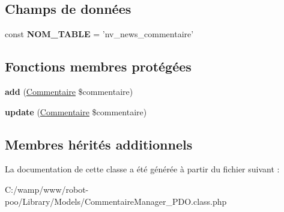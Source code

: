 \subsection*{Champs de données}
\begin{DoxyCompactItemize}
\item 
\hypertarget{class_library_1_1_models_1_1_commentaire_manager___p_d_o_a243755033f10b0817aa9d990cc252817}{const {\bfseries N\+O\+M\+\_\+\+T\+A\+B\+L\+E} = 'nv\+\_\+news\+\_\+commentaire'}\label{class_library_1_1_models_1_1_commentaire_manager___p_d_o_a243755033f10b0817aa9d990cc252817}

\end{DoxyCompactItemize}
\subsection*{Fonctions membres protégées}
\begin{DoxyCompactItemize}
\item 
\hypertarget{class_library_1_1_models_1_1_commentaire_manager___p_d_o_a061ee602fea7e6e7901bced121a867e1}{{\bfseries add} (\hyperlink{class_library_1_1_entities_1_1_commentaire}{Commentaire} \$commentaire)}\label{class_library_1_1_models_1_1_commentaire_manager___p_d_o_a061ee602fea7e6e7901bced121a867e1}

\item 
\hypertarget{class_library_1_1_models_1_1_commentaire_manager___p_d_o_ad360efa5cec15a5eea694752003ab09b}{{\bfseries update} (\hyperlink{class_library_1_1_entities_1_1_commentaire}{Commentaire} \$commentaire)}\label{class_library_1_1_models_1_1_commentaire_manager___p_d_o_ad360efa5cec15a5eea694752003ab09b}

\end{DoxyCompactItemize}
\subsection*{Membres hérités additionnels}


La documentation de cette classe a été générée à partir du fichier suivant \+:\begin{DoxyCompactItemize}
\item 
C\+:/wamp/www/robot-\/poo/\+Library/\+Models/Commentaire\+Manager\+\_\+\+P\+D\+O.\+class.\+php\end{DoxyCompactItemize}
